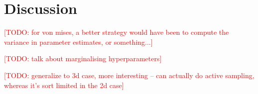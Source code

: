 \documentclass{article} %
\newcommand{\TODO}[1]{\textcolor{red}{[TODO: #1]}}
\begin{document}
\section{Discussion}

\TODO{for von mises, a better strategy would have been to compute the
  variance in parameter estimates, or something...}

\TODO{talk about marginalising hyperparameters}

\TODO{generalize to 3d case, more interesting -- can actually do
  active sampling, whereas it's sort limited in the 2d case}

\renewcommand\refname{\normalsize{References}}


\end{document}
